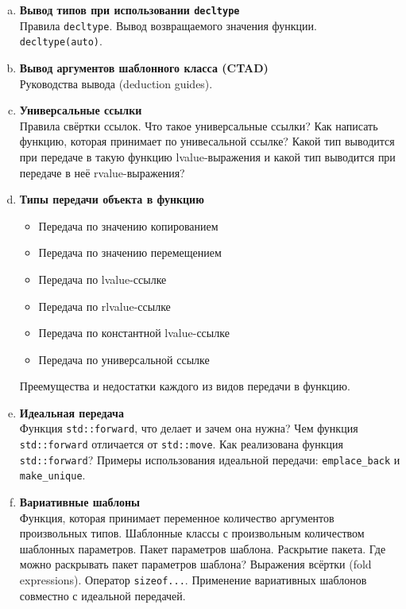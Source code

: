 \documentclass{article}
\begin{document}
\begin{enumerate}
\begin{enumerate}[a.]
\item \textbf{Вывод типов при использовании \texttt{decltype}}\\
Правила \texttt{decltype}. Вывод возвращаемого значения функции.
\texttt{decltype(auto)}.


\item \textbf{Вывод аргументов шаблонного класса (CTAD)}\\
Руководства вывода (deduction guides).

\item \textbf{Универсальные ссылки}\\
Правила свёртки ссылок. Что такое универсальные ссылки? Как написать функцию, которая принимает по унивесальной ссылке? Какой тип выводится при передаче в такую функцию lvalue-выражения и какой тип выводится при передаче в неё rvalue-выражения? 

\item \textbf{Типы передачи объекта в функцию}
\begin{itemize}
\item Передача по значению копированием
\item Передача по значению перемещением
\item Передача по lvalue-ссылке
\item Передача по rlvalue-ссылке
\item Передача по константной lvalue-ссылке
\item Передача по универсальной ссылке
\end{itemize}
Преемущества и недостатки каждого из видов передачи в функцию.

\item \textbf{Идеальная передача}\\
Функция \texttt{std::forward}, что делает и зачем она нужна? Чем функция \texttt{std::forward} отличается от \texttt{std::move}. Как реализована функция \texttt{std::forward}? Примеры использования идеальной передачи: \texttt{emplace\_back} и \texttt{make\_unique}.

\item \textbf{Вариативные шаблоны}\\
Функция, которая принимает переменное количество аргументов произвольных типов. Шаблонные классы с произвольным количеством шаблонных параметров. Пакет параметров шаблона. Раскрытие пакета. Где можно раскрывать пакет параметров шаблона? Выражения всёртки (fold expressions). Оператор \texttt{sizeof...}. Применение вариативных шаблонов совместно с идеальной передачей.
\end{enumerate}




\end{enumerate}
\end{document}
